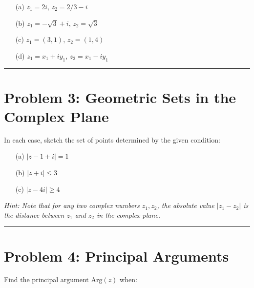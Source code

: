 \documentclass{article}
\begin{document}
\begin{enumerate}
    \item[(a)] $z_1 = 2i$, $z_2 = 2/3-i$
    
    \vspace{.5cm} %
    
    \item[(b)] $z_1 = -\sqrt{3}+i$, $z_2 = \sqrt{3}$
    
    \vspace{.5cm} %
    
    \item[(c)] $z_1 = (3,1)$, $z_2 = (1,4)$
    
    \vspace{.5cm} %
    
    \item[(d)] $z_1 = x_1+iy_1$, $z_2 = x_1-iy_1$
    
    \vspace{.5cm} %
\end{enumerate}

\hrule

\newpage
\section*{Problem 3: Geometric Sets in the Complex Plane}
In each case, sketch the set of points determined by the given condition:

\begin{enumerate}
    \item[(a)] $|z-1+i|=1$
    
    \vspace{.5cm} %
    
    \item[(b)] $|z+i| \leq 3$
    
    \vspace{.5cm} %
    
    \item[(c)] $|z-4i|\geq4$
    
    \vspace{.5cm} %
\end{enumerate}

\textit{Hint: Note that for any two complex numbers $z_1, z_2$, the absolute value $|z_1 - z_2|$ is the distance between $z_1$ and $z_2$ in the complex plane.}

\hrule

\newpage
\section*{Problem 4: Principal Arguments}
Find the principal argument $\text{Arg}(z)$ when:
\end{document}
